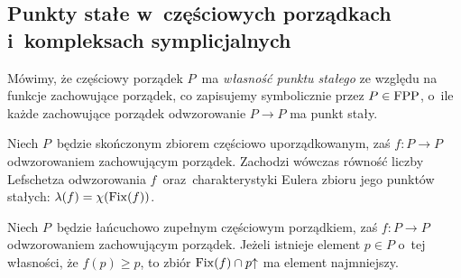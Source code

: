 \subsection{Punkty stałe w~częściowych porządkach i~kompleksach symplicjalnych}
Mówimy, że częściowy porządek $P$~ma \textit{własność punktu stałego} ze względu na funkcje zachowujące porządek, co zapisujemy symbolicznie przez $P\in \mathrm{FPP}$, o~ile każde zachowujące porządek odwzorowanie $P\to P$ ma punkt stały.

\begin{tw}\label{tw-baclawski-bjorner}
Niech $P$~będzie skończonym zbiorem częściowo uporządkowanym, zaś $f\colon P\to P$ odwzorowaniem zachowującym porządek. Zachodzi wówczas równość liczby Lefschetza odwzorowania $f$~oraz~charakterystyki Eulera zbioru jego punktów stałych: $\lambda(f)=\chi(\operatorname{Fix}(f))$.
\end{tw}

\begin{tw}\label{tw-abiana_browna}
Niech $P$~będzie łańcuchowo zupełnym częściowym porządkiem, zaś $f\colon P\to P$ odwzorowaniem zachowującym porządek. Jeżeli istnieje element $p\in P$ o~tej własności, że $f(p)\geq p$, to zbiór $\operatorname{Fix}(f)\cap p\mathord{\uparrow}$ ma element najmniejszy.
\end{tw}

